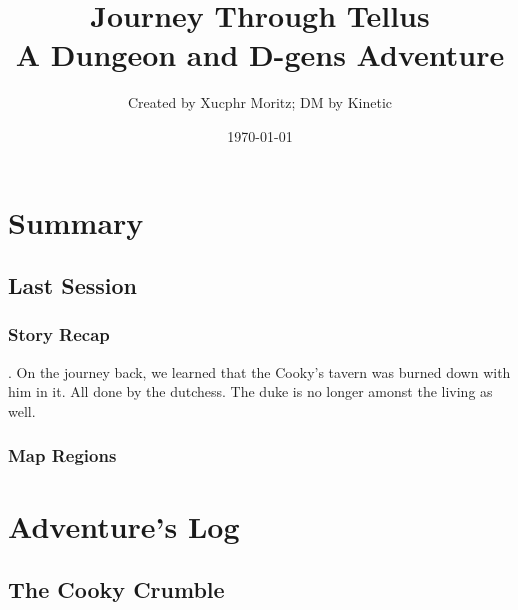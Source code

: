 \documentclass[letterpaper,twocolumn,openany,nodeprecatedcode]{dndbook}
\title{Journey Through Tellus \\
\large A Dungeon and D-gens Adventure}
\author{Created by Xucphr Moritz; DM by Kinetic}
\date{\today}
\begin{document}
\frontmatter

\maketitle

\tableofcontents

\mainmatter%

\part{Summary}


\chapter*{Last Session}
\section{Story Recap}
. On the journey back, we learned that the Cooky's tavern was burned down with him in it.
All done by the dutchess. The duke is no longer amonst the living as well.


\section{Map Regions}





\part{Adventure's Log}
\chapter{The Cooky Crumble}

\end{document}
